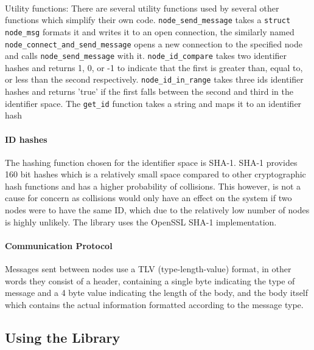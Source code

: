 \documentclass{article}
\begin{document}
\\
Utility functions: There are several utility functions used by several other functions which simplify their own code.
\texttt{node\_send\_message} takes a \texttt{struct node\_msg} formats it and writes it to an open connection, the similarly named \texttt{node\_connect\_and\_send\_message} opens a new connection to the specified node and calls \texttt{node\_send\_message} with it.
\texttt{node\_id\_compare} takes two identifier hashes and returns 1, 0, or -1 to indicate that the first is greater than, equal to, or less than the second respectively.
\texttt{node\_id\_in\_range} takes three ids identifier hashes and returns 'true' if the first falls between the second and third in the identifier space.
The \texttt{get\_id} function takes a string and maps it to an identifier hash

\paragraph{ID hashes}
The hashing function chosen for the identifier space is SHA-1. SHA-1 provides 160 bit hashes which is a relatively small space compared to other cryptographic hash functions and has a higher probability of collisions. This however, is not a cause for concern as collisions would only have an effect on the system if two nodes were to have the same ID, which due to the relatively low number of nodes is highly unlikely.
The library uses the OpenSSL \cite{openssl} SHA-1 implementation.

\paragraph{Communication Protocol}
Messages sent between nodes use a TLV (type-length-value) format, in other words they consist of a header, containing a single byte indicating the type of message and a 4 byte value indicating the length of the body, and the body itself which contains the actual information formatted according to the message type.

\subsection{Using the Library}
\end{document}
